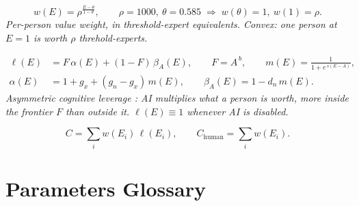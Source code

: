 \documentclass[11pt]{article}
\newcommand{\eqnote}[1]{{\small\itshape #1}\par\addvspace{4pt}}
\begin{document}
\begin{equation}\label{eq:E18}
  w(E) = \rho^{\frac{E - \theta}{1 - \theta}}, \qquad
  \rho = 1000,\ \theta = 0.585
  \;\Longrightarrow\; w(\theta) = 1,\ w(1) = \rho .
\end{equation}
\eqnote{Per-person value weight, in threshold-expert equivalents. Convex: one
person at $E = 1$ is worth $\rho$ threhold-experts.}

\begin{equation}\label{eq:E19}
  \begin{aligned}
    \ell(E) &= F\,\alpha(E) + (1 - F)\,\beta_A(E), \qquad
              F = A^{\,b}, \qquad
              m(E) = \frac{1}{1 + e^{\,s(E - A)}},\\[2pt]
    \alpha(E) &= 1 + g_x + (g_n - g_x)\,m(E), \qquad
    \beta_A(E) = 1 - d_n\,m(E).
  \end{aligned}
\end{equation}
\eqnote{Asymmetric cognitive leverage \cite{fabrizio_dellacqua_navigating_nodate}: AI multiplies what a
person is worth, more inside the frontier $F$ than outside it. $\ell(E) \equiv 1$
whenever AI is disabled.}

\begin{equation}\label{eq:E20}
  C = \sum_i w(E_i)\,\ell(E_i), \qquad
  C_{\text{human}} = \sum_i w(E_i).
\end{equation}

\section*{Parameters  Glossary}
\end{document}
